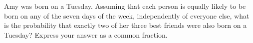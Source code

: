 Amy was born on a Tuesday. Assuming that each person is equally likely to be born on any of the seven days of the week, independently of everyone else, what is the probability that exactly two of her three best friends were also born on a Tuesday? Express your answer as a common fraction.

